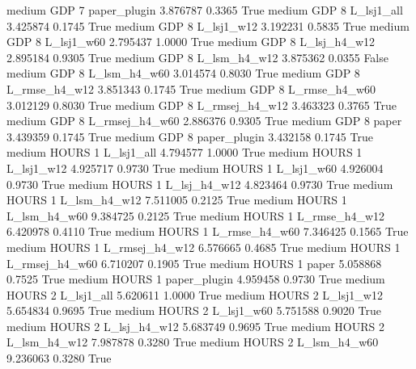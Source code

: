     medium      GDP                 7   paper_plugin   3.876787      0.3365    True
    medium      GDP                 8     L_lsj1_all   3.425874      0.1745    True
    medium      GDP                 8     L_lsj1_w12   3.192231      0.5835    True
    medium      GDP                 8     L_lsj1_w60   2.795437      1.0000    True
    medium      GDP                 8   L_lsj_h4_w12   2.895184      0.9305    True
    medium      GDP                 8   L_lsm_h4_w12   3.875362      0.0355   False
    medium      GDP                 8   L_lsm_h4_w60   3.014574      0.8030    True
    medium      GDP                 8  L_rmse_h4_w12   3.851343      0.1745    True
    medium      GDP                 8  L_rmse_h4_w60   3.012129      0.8030    True
    medium      GDP                 8 L_rmsej_h4_w12   3.463323      0.3765    True
    medium      GDP                 8 L_rmsej_h4_w60   2.886376      0.9305    True
    medium      GDP                 8          paper   3.439359      0.1745    True
    medium      GDP                 8   paper_plugin   3.432158      0.1745    True
    medium    HOURS                 1     L_lsj1_all   4.794577      1.0000    True
    medium    HOURS                 1     L_lsj1_w12   4.925717      0.9730    True
    medium    HOURS                 1     L_lsj1_w60   4.926004      0.9730    True
    medium    HOURS                 1   L_lsj_h4_w12   4.823464      0.9730    True
    medium    HOURS                 1   L_lsm_h4_w12   7.511005      0.2125    True
    medium    HOURS                 1   L_lsm_h4_w60   9.384725      0.2125    True
    medium    HOURS                 1  L_rmse_h4_w12   6.420978      0.4110    True
    medium    HOURS                 1  L_rmse_h4_w60   7.346425      0.1565    True
    medium    HOURS                 1 L_rmsej_h4_w12   6.576665      0.4685    True
    medium    HOURS                 1 L_rmsej_h4_w60   6.710207      0.1905    True
    medium    HOURS                 1          paper   5.058868      0.7525    True
    medium    HOURS                 1   paper_plugin   4.959458      0.9730    True
    medium    HOURS                 2     L_lsj1_all   5.620611      1.0000    True
    medium    HOURS                 2     L_lsj1_w12   5.654834      0.9695    True
    medium    HOURS                 2     L_lsj1_w60   5.751588      0.9020    True
    medium    HOURS                 2   L_lsj_h4_w12   5.683749      0.9695    True
    medium    HOURS                 2   L_lsm_h4_w12   7.987878      0.3280    True
    medium    HOURS                 2   L_lsm_h4_w60   9.236063      0.3280    True
